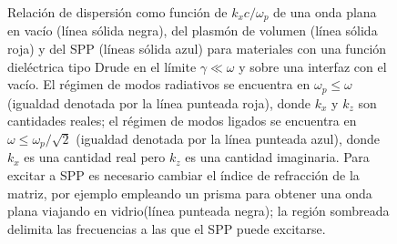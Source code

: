 	
	\begin{figure}[h!]\centering
\vspace*{-1em}
	\caption{Relación de dispersión como función de $k_xc/\omega_p$ de una onda plana en vacío (línea sólida negra), del plasmón de volumen (línea sólida roja) y del SPP (líneas sólida azul) para materiales con una función dieléctrica tipo Drude en el límite $\gamma\ll\omega$ y sobre una interfaz con el vacío. El régimen de modos radiativos se encuentra en $\omega_p\leq\omega$ (igualdad denotada por la línea punteada roja), donde $k_x$ y $k_z$ son cantidades reales; el régimen de modos ligados se encuentra en $\omega\leq\omega_p/\sqrt{2}$ (igualdad denotada por la línea punteada azul), donde $k_x$ es una cantidad real pero $k_z$ es una cantidad imaginaria. Para excitar a SPP es necesario cambiar el índice de refracción de la matriz, por ejemplo empleando un prisma para obtener una onda plana viajando en vidrio(línea punteada negra); la región sombreada delimita las frecuencias a las que el SPP puede excitarse.}
	\label{fig:NormalModes}
	\end{figure}		
	
